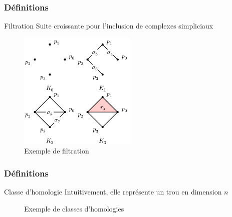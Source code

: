 \documentclass{beamer}
\begin{document}
\begin{frame}
    \frametitle{Définitions}
    \begin{block}{Filtration}
        Suite croissante pour l'inclusion de complexes simpliciaux
    \end{block}

    \begin{figure}
        \includegraphics[width=0.5\textwidth]{../images/filtration_ex.png}
        \centering
        \caption{Exemple de filtration}
    \end{figure}
\end{frame}
\begin{frame}
    \frametitle{Définitions}
    \begin{block}{Classe d'homologie}
        Intuitivement, elle représente un trou en dimension $n$

    \end{block}

    \begin{figure}
        \caption{Exemple de classes d'homologies}
    \end{figure}
\end{frame}
\end{document}
